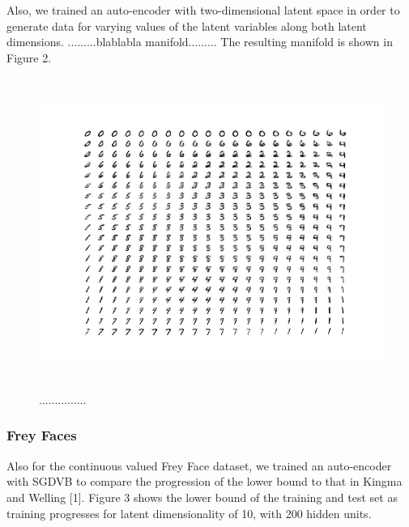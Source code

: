 \documentclass{article}
\begin{document}
Also, we trained an auto-encoder with two-dimensional latent space in order to generate data for varying values of the latent variables along both latent dimensions. .........blablabla manifold......... The resulting manifold is shown in Figure 2.

\begin{figure}[htb]
\begin{center}
\includegraphics[height=4in,width=5in]{manifoldMNIST.png}
\caption{...............}
\end{center}
\end{figure}

\subsubsection{Frey Faces}

Also for the continuous valued Frey Face dataset, we trained an auto-encoder with SGDVB to compare the progression of the lower bound to that in Kingma and Welling [1]. Figure 3 shows the lower bound of the training and test set as training progresses for latent dimensionality of 10, with 200 hidden units.
\end{document}
